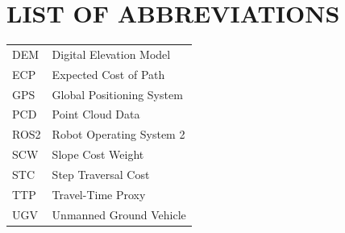 \chapter{LIST OF ABBREVIATIONS}

\onehalfspacing
\noindent
\begin{tabular}{p{3.0cm}p{10.0cm}} 
DEM & Digital Elevation Model\\
ECP & Expected Cost of Path\\
GPS & Global Positioning System\\
PCD & Point Cloud Data\\
ROS2 & Robot Operating System 2\\
SCW & Slope Cost Weight\\
STC & Step Traversal Cost\\
TTP & Travel-Time Proxy\\
UGV & Unmanned Ground Vehicle\\
\end{tabular}
